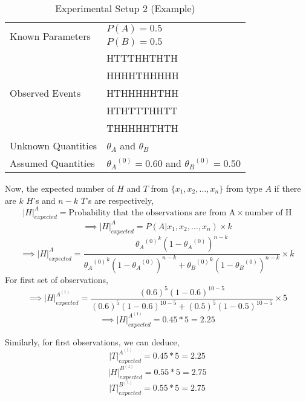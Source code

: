 \begin{table}[]
\centering
\caption{Experimental Setup 2 (Example)}
\label{exp3}
\begin{tabular}{|l|l|}
\hline
\multirow{2}{*}{Known Parameters}                 & $P(A)=0.5$ \\ \cline{2-2}
                                                  & $P(B)=0.5$ \\ \hline
                                                                  
\multirow{5}{*}{Observed Events} & HTTTHHTHTH \\ \cline{2-2} 
                   & HHHHTHHHHH \\ \cline{2-2} 
                   & HTHHHHHTHH \\ \cline{2-2} 
                   & HTHTTTHHTT \\ \cline{2-2} 
                   & THHHHHTHTH \\ \hline

Unknown Quantities                  & $\theta_A$ and $\theta_B$ \\ \hline
Assumed Quantities                  & ${\theta_A}^{(0)}=0.60$ and ${\theta_B}^{(0)}=0.50$ \\ \hline
           
\end{tabular}
\end{table}


Now, the expected number of $H$ and $T$ from $\{x_1,x_2, \ldots, x_n\}$ from type $A$ if there are $k$ $H$'s and $n-k$ $T$'s are respectively,
\[{\lvert  H \rvert}_{expected}^{A} = \text{Probability that the observations are from A} \times \text{number of H} \] 
\[\implies {\lvert  H \rvert}_{expected}^{A} = P(A \rvert x_1,x_2, \ldots, x_n ) \times k \]
\[\implies 
 {\lvert  H \rvert}_{expected}^{A}= \frac{{ {\theta_{A}}^{(0)}}^{k}{(1-{\theta_{A}}^{(0)} ) }^{n-k}}{{{{\theta_{A}}^{(0)}}^{k}}{(1-{\theta_{A}}^{(0)})}^{n-k}+ {{\theta_{B}}^{(0)}}^{k}{(1-{\theta_{B}}^{(0)})}^{n-k}} \times k
\]
For first set of observations,
\[\implies {\lvert  H \rvert}_{expected}^{A^{(1)}} = \frac{ {(0.6)}^{5} {(1-0.6)}^{10-5} } { {(0.6)}^{5}{(1-0.6)}^{10-5} + {(0.5)}^{5}{(1-0.5)}^{10-5}} \times 5 \]
\[\implies {\lvert  H \rvert}_{expected}^{A^{(1)}} = 0.45 * 5 =2.25\]

Similarly, for first observations, we can deduce,
\[{\lvert  T \rvert}_{expected}^{A^{(1)}} = 0.45 * 5 =2.25\]
\[{\lvert  H \rvert}_{expected}^{B^{(1)}} = 0.55 * 5 =2.75\]
\[{\lvert  T \rvert}_{expected}^{B^{(1)}} = 0.55 * 5 =2.75\]


